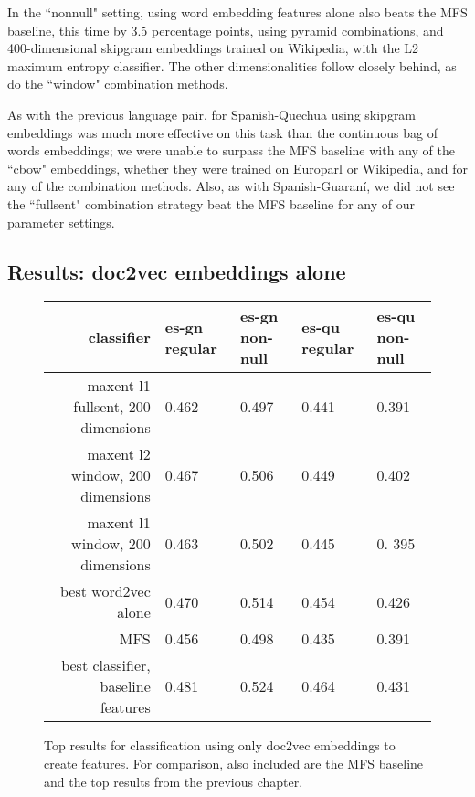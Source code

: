 In the ``nonnull" setting, using word embedding features alone also beats the
MFS baseline, this time by 3.5 percentage points, using pyramid combinations,
and 400-dimensional skipgram embeddings trained on Wikipedia, with the L2
maximum entropy classifier. The other dimensionalities follow closely behind,
as do the ``window" combination methods.

As with the previous language pair, for Spanish-Quechua using skipgram
embeddings was much more effective on this task than the continuous bag of
words embeddings; we were unable to surpass the MFS baseline with any of the
``cbow" embeddings, whether they were trained on Europarl or Wikipedia, and for
any of the combination methods. Also, as with Spanish-Guaraní, we did not see
the ``fullsent" combination strategy beat the MFS baseline for any of our
parameter settings.

\subsection{Results: doc2vec embeddings alone}

\begin{figure*}
  \begin{centering}
  \begin{tabulary}{\textwidth}{|R|L|L|L|L|}
    \hline
    classifier & es-gn regular & es-gn non-null & es-qu regular & es-qu non-null \\
    \hline
    maxent l1 fullsent, 200 dimensions & 0.462 & 0.497 & 0.441 & 0.391 \\
    \hline
    maxent l2 window, 200 dimensions & 0.467 & 0.506 & 0.449 & 0.402 \\
    \hline
    maxent l1 window, 200 dimensions & 0.463 & 0.502 & 0.445 & 0. 395\\
    \hline
    best word2vec alone & 0.470 & 0.514 & 0.454 & 0.426 \\
    \hline
    MFS    & 0.456 & 0.498 & 0.435 & 0.391 \\
    \hline
    best classifier, baseline features & 0.481 & 0.524 & 0.464 & 0.431 \\
    \hline
  \end{tabulary}
  \end{centering}
  \caption{Top results for classification using only doc2vec embeddings to
  create features. For comparison, also included are the MFS baseline and the
  top results from the previous chapter.}
  \label{fig:doc2vec-alone-results}
\end{figure*}

